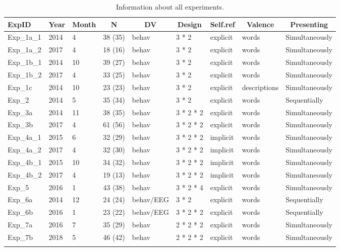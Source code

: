 \documentclass[
  english,
  man]{apa6}
\begin{document}
\begin{table}[tbp]

\begin{center}
\begin{threeparttable}

\caption{\label{tab:Table1_exp_info}Information about all experiments.}

\begin{tabular}{lllllllll}
\toprule
ExpID & \multicolumn{1}{c}{Year} & \multicolumn{1}{c}{Month} & \multicolumn{1}{c}{N} & \multicolumn{1}{c}{DV} & \multicolumn{1}{c}{Design} & \multicolumn{1}{c}{Self.ref} & \multicolumn{1}{c}{Valence} & \multicolumn{1}{c}{Presenting}\\
\midrule
Exp\_1a\_1 & 2014 & 4 & 38 (35) & behav & 3 * 2 & explicit & words & Simultaneously\\
Exp\_1a\_2 & 2017 & 4 & 18 (16) & behav & 3 * 2 & explicit & words & Simultaneously\\
Exp\_1b\_1 & 2014 & 10 & 39 (27) & behav & 3 * 2 & explicit & words & Simultaneously\\
Exp\_1b\_2 & 2017 & 4 & 33 (25) & behav & 3 * 2 & explicit & words & Simultaneously\\
Exp\_1c & 2014 & 10 & 23 (23) & behav & 3 * 2 & explicit & descriptions & Simultaneously\\
Exp\_2 & 2014 & 5 & 35 (34) & behav & 3 * 2 & explicit & words & Sequentially\\
Exp\_3a & 2014 & 11 & 38 (35) & behav & 3 * 2 * 2 & explicit & words & Simultaneously\\
Exp\_3b & 2017 & 4 & 61 (56) & behav & 3 * 2 * 2 & explicit & words & Simultaneously\\
Exp\_4a\_1 & 2015 & 6 & 32 (29) & behav & 3 * 2 * 2 & implicit & words & Simultaneously\\
Exp\_4a\_2 & 2017 & 4 & 32 (30) & behav & 3 * 2 * 2 & implicit & words & Simultaneously\\
Exp\_4b\_1 & 2015 & 10 & 34 (32) & behav & 3 * 2 * 2 & implicit & words & Simultaneously\\
Exp\_4b\_2 & 2017 & 4 & 19 (13) & behav & 3 * 2 * 2 & implicit & words & Simultaneously\\
Exp\_5 & 2016 & 1 & 43 (38) & behav & 3 * 2 * 4 & explicit & words & Simultaneously\\
Exp\_6a & 2014 & 12 & 24 (24) & behav/EEG & 3 * 2 & explicit & words & Sequentially\\
Exp\_6b & 2016 & 1 & 23 (22) & behav/EEG & 3 * 2 * 2 & explicit & words & Sequentially\\
Exp\_7a & 2016 & 7 & 35 (29) & behav & 2 * 2 * 2 & explicit & words & Simultaneously\\
Exp\_7b & 2018 & 5 & 46 (42) & behav & 2 * 2 * 2 & explicit & words & Simultaneously\\
\bottomrule
\addlinespace
\end{tabular}


\end{threeparttable}
\end{center}
\end{table}
\end{document}
